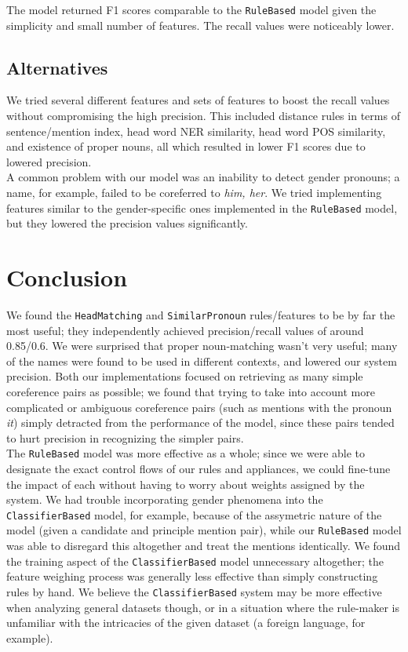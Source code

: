 \documentclass[12pt]{article}
\begin{document}
The model returned F1 scores comparable to the \texttt{RuleBased} model given the simplicity and small number of features. The recall values were noticeably lower.
\subsection{Alternatives}
We tried several different features and sets of features to boost the recall values without compromising the high precision. This included distance rules in terms of sentence/mention index, head word NER similarity, head word POS similarity, and existence of proper nouns, all which resulted in lower F1 scores due to lowered precision.\\

 A common problem with our model was an inability to detect gender pronouns; a name, for example, failed to be coreferred to \emph{him, her}. We tried implementing features similar to the gender-specific ones implemented in the \texttt{RuleBased} model, but they lowered the precision values significantly. 
\section{Conclusion}
We found the \texttt{HeadMatching}  and \texttt{SimilarPronoun} rules/features to be by far the most useful; they independently achieved precision/recall values of around 0.85/0.6. We were surprised that proper noun-matching wasn't very useful; many of the names were found to be used in different contexts, and lowered our system precision. Both our implementations focused on retrieving as many simple coreference pairs as possible; we found that trying to take into account more complicated or ambiguous coreference pairs (such as mentions with the pronoun \emph{it}) simply detracted from the performance of the model, since these pairs tended to hurt precision in recognizing the simpler pairs.\\

The \texttt{RuleBased} model was more effective as a whole; since we were able to designate the exact control flows of our rules and appliances, we could fine-tune the impact of each without having to worry about weights assigned by the system. We had trouble incorporating gender phenomena into the \texttt{ClassifierBased} model, for example, because of the assymetric nature of the model (given a candidate and principle mention pair), while our \texttt{RuleBased} model was able to disregard this altogether and treat the mentions identically. We found the training aspect of the \texttt{ClassifierBased} model unnecessary altogether; the feature weighing process was generally less effective than simply constructing rules by hand. We believe the \texttt{ClassifierBased} system may be more effective when analyzing general datasets though, or in a situation where the rule-maker is unfamiliar with the intricacies of the given dataset (a foreign language, for example).\\
\end{document}

